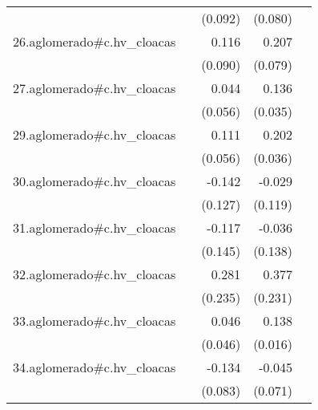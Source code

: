 {\begin{longtable}{l*{4}{D{.}{.}{-1}}}
            &                     &     (0.092)         &     (0.080)         &                     \\
\addlinespace
26.aglomerado#c.hv\_cloacas&                     &       0.116         &       0.207\sym{**} &                     \\
            &                     &     (0.090)         &     (0.079)         &                     \\
\addlinespace
27.aglomerado#c.hv\_cloacas&                     &       0.044         &       0.136\sym{***}&                     \\
            &                     &     (0.056)         &     (0.035)         &                     \\
\addlinespace
29.aglomerado#c.hv\_cloacas&                     &       0.111\sym{*}  &       0.202\sym{***}&                     \\
            &                     &     (0.056)         &     (0.036)         &                     \\
\addlinespace
30.aglomerado#c.hv\_cloacas&                     &      -0.142         &      -0.029         &                     \\
            &                     &     (0.127)         &     (0.119)         &                     \\
\addlinespace
31.aglomerado#c.hv\_cloacas&                     &      -0.117         &      -0.036         &                     \\
            &                     &     (0.145)         &     (0.138)         &                     \\
\addlinespace
32.aglomerado#c.hv\_cloacas&                     &       0.281         &       0.377         &                     \\
            &                     &     (0.235)         &     (0.231)         &                     \\
\addlinespace
33.aglomerado#c.hv\_cloacas&                     &       0.046         &       0.138\sym{***}&                     \\
            &                     &     (0.046)         &     (0.016)         &                     \\
\addlinespace
34.aglomerado#c.hv\_cloacas&                     &      -0.134         &      -0.045         &                     \\
            &                     &     (0.083)         &     (0.071)         &                     \\

\end{longtable}}
